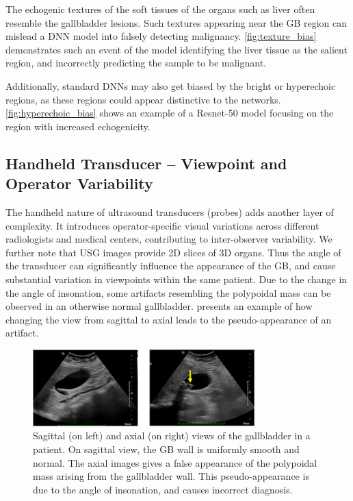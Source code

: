 The echogenic textures of the soft tissues of the organs such as liver often resemble the gallbladder lesions. Such textures appearing near the GB region can mislead a DNN model into falsely detecting malignancy. \cref{fig:texture_bias} demonstrates such an event of the model identifying the liver tissue as the salient region, and incorrectly predicting the sample to be malignant.

Additionally, standard DNNs may also get biased by the bright or hyperechoic regions, as these regions could appear distinctive to the networks. \cref{fig:hyperechoic_bias} shows an example of a Resnet-50 model focusing on the region with increased echogenicity. 



\subsection{Handheld Transducer -- Viewpoint and Operator Variability}
%
The handheld nature of ultrasound transducers (probes) adds another layer of complexity. It introduces operator-specific visual variations across different radiologists and medical centers, contributing to inter-observer variability. 
We further note that USG images provide 2D slices of 3D organs. Thus the angle of the transducer can significantly influence the appearance of the GB, and cause substantial variation in viewpoints within the same patient. Due to the change in the angle of insonation, some artifacts resembling the polypoidal mass can be observed in an otherwise normal gallbladder.  presents an example of how changing the view from sagittal to axial leads to the pseudo-appearance of an artifact. 

\begin{figure}[t]
    \centering
    \includegraphics[width=0.6\linewidth, height=8em]{figs/angle_pseudo.png}
    \caption[Angle of transducer causing pseudo structures]{Sagittal (on left) and axial (on right) views of the gallbladder in a patient. On sagittal view, the GB wall is uniformly smooth and normal. The axial images gives a false appearance of the polypoidal mass arising from the gallbladder wall. This pseudo-appearance is due to the angle of insonation, and causes incorrect diagnosis.}
    \label{fig:angle_pseudo}
\end{figure}

